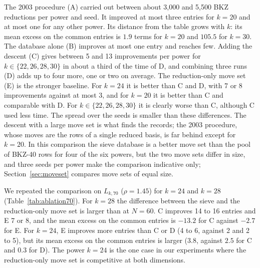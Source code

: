 \documentclass[11pt]{amsart}
\theoremstyle{definition}
\theoremstyle{remark}
\begin{document}
The 2003 procedure (A) carried out between about 3,000 and 5,500 BKZ reductions per power and
seed. It improved at most three entries for $k=20$ and at most one for any other power. Its distance from the table grows with $k$:
its mean excess on the common entries is $1.9$ terms for $k=20$ and $105.5$ for $k=30$. The
database alone (B) improves at most one entry and reaches few. Adding the descent (C) gives
between 5 and 13 improvements per power for $k\in\{22,26,28,30\}$ in about a third of the time
of D, and combining three runs (D) adds up to four more, one or two on average. The
reduction-only move set (E) is the stronger baseline. For $k=24$ it is better than C and D, with 7 or 8
improvements against at most 3, and for $k=20$ it is better than C and comparable with D. For $k\in\{22,26,28,30\}$ it is
clearly worse than C, although C used less time. The spread over the seeds is smaller than
these differences. The descent with a large move set is what finds the records; the 2003
procedure, whose moves are the rows of a single reduced basis, is far behind except for $k=20$.
In this
comparison the sieve database is a better move set than the pool of BKZ-40 rows for four of the
six powers, but the two move sets differ in size, and three seeds per power make the comparison
indicative only; Section~\ref{sec:moveset} compares move sets of equal size.

We repeated the comparison on $L_{k,70}$ ($\rho=1.45$) for $k=24$ and $k=28$
(Table~\ref{tab:ablation70}). For $k=28$ the difference between the sieve and the
reduction-only move set is larger than at $N=60$. C improves 14 to 16 entries and E 7 or 8,
and the mean excess on the common entries is $-13.2$ for C against $-2.7$ for E. For $k=24$,
E improves more entries than C or D (4 to 6, against 2 and 2 to 5), but its mean excess on the
common entries is larger ($3.8$, against $2.5$ for C and $0.3$ for D). The power $k=24$ is the
one case in our experiments where the reduction-only move set is competitive at both
dimensions.


\begin{table}[htbp]
\centering\small

\caption{The stages of the method and two baselines on $L_{k,60}$, \AblSeeds{} seeds each
(Section~\ref{sec:ablation}). Time is the mean wall time on 16 cores. ``Improved'' gives the
range over the seeds of the number of entries with $m\le16$ below the table; ``reached'' is
the mean number of entries for which an identity was found. ``Excess'' is the mean of
$n-n_{\mathrm{table}}$ over the entries reached by methods A, C, D and E in every seed, averaged
over the seeds, $\pm$ its standard deviation over the seeds; ``median'' is the median of
$n-n_{\mathrm{table}}$ over the same entries, averaged over the seeds. The number in parentheses
after $k$ is the number of these entries. A negative value means that the method is on average
below the table.}\label{tab:ablation}
\end{table}
\begin{table}[htbp]
\centering\small

\caption{As Table~\ref{tab:ablation}, on $L_{k,70}$ with $\rho=1.45$.}\label{tab:ablation70}
\end{table}
\end{document}

